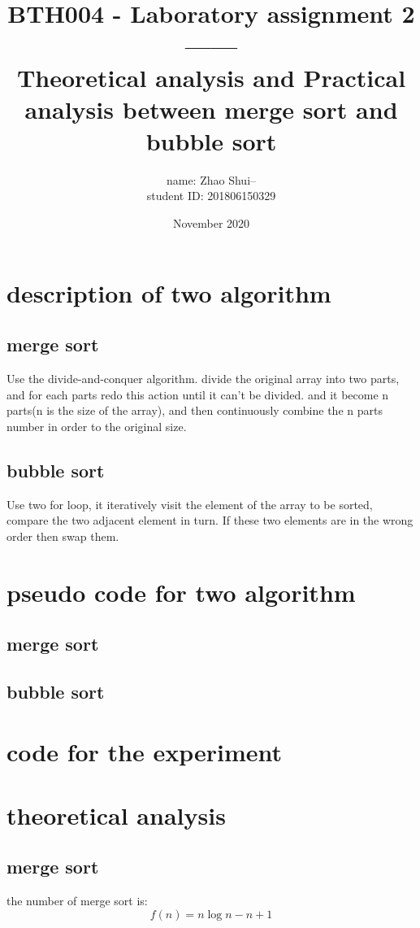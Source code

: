 \documentclass{article}
\title{BTH004 - Laboratory assignment 2------\\
Theoretical analysis and Practical analysis between merge sort and bubble sort}
\author{name: Zhao Shui--\\student ID: 201806150329}
\date{November 2020}
\begin{document}
\maketitle

\section{description of two algorithm}
\subsection{merge sort}
Use the divide-and-conquer algorithm. divide the original array into two parts, and for each parts redo this action until it can't be divided. and it become n parts(n is the size of the array), and then continuously combine the n parts number in order to the original size.
\subsection{bubble sort}
Use two for loop, it iteratively visit the element of the array to be sorted, compare the two adjacent element in turn. If these two elements are in the wrong order then swap them.

\section{pseudo code for two algorithm}
\subsection{merge sort}

\subsection{bubble sort}


\section{code for the experiment}


\section{theoretical analysis}
\subsection{merge sort}
the number of merge sort is:
\[
f(n) = n\log{n} - n + 1
\]
\end{document}
